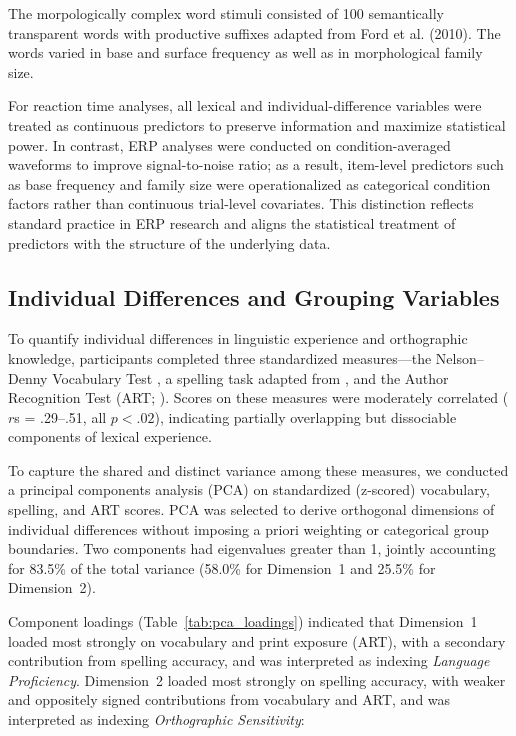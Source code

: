 \documentclass[utf8]{FrontiersinHarvard} %
\begin{document}
	The morpologically complex word stimuli consisted of  100 semantically transparent words with productive	suffixes adapted from Ford et al. (2010). The words varied in base and surface frequency as well as in morphological family size.  
	
	For reaction time analyses, all lexical and individual-difference variables were treated as continuous predictors to preserve information and maximize statistical power. In contrast, ERP analyses were conducted on condition-averaged waveforms to improve signal-to-noise ratio; as a result, item-level predictors such as base frequency and family size were operationalized as categorical condition factors rather than continuous trial-level covariates. This distinction reflects standard practice in ERP research and aligns the statistical treatment of predictors with the structure of the underlying data.
	
	\subsection{Individual Differences and Grouping Variables}
	
	To quantify individual differences in linguistic experience and orthographic knowledge, participants completed three standardized measures---the Nelson–Denny Vocabulary Test \citep{brownNelsonDennyReadingTest1993}, a spelling task adapted from \citet{sawiIndividualDifferencesSensitivity2016}, and the Author Recognition Test (ART; \citealt{stanovichExposurePrintOrthographic1989}). Scores on these measures were moderately correlated ($r$s = .29–.51, all $p < .02$), indicating partially overlapping but dissociable components of lexical experience.
	
	To capture the shared and distinct variance among these measures, we conducted a principal components analysis (PCA) on standardized (z-scored) vocabulary, spelling, and ART scores. PCA was selected to derive orthogonal dimensions of individual differences without imposing a priori weighting or categorical group boundaries. Two components had eigenvalues greater than 1, jointly accounting for 83.5\% of the total variance (58.0\% for Dimension~1 and 25.5\% for Dimension~2).
	
	Component loadings (Table~\ref{tab:pca_loadings}) indicated that Dimension~1 loaded most strongly on vocabulary and print exposure (ART), with a secondary contribution from spelling accuracy, and was interpreted as indexing \textit{Language Proficiency}. Dimension~2 loaded most strongly on spelling accuracy, with weaker and oppositely signed contributions from vocabulary and ART, and was interpreted as indexing \textit{Orthographic Sensitivity}:
	
\end{document}
